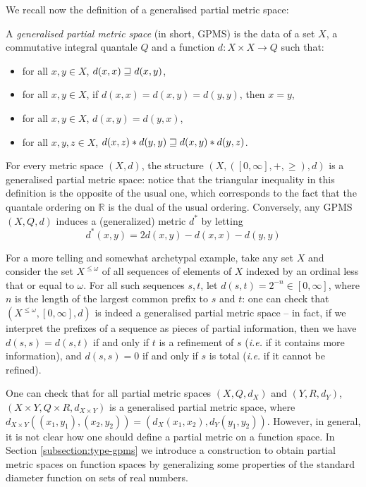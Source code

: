 We recall now the definition of a generalised partial metric space:


\begin{definition} A \emph{generalised partial metric space} (in short, GPMS) is the data of a set $X$, a commutative integral quantale $Q$ and a function $d : X \times X \to Q$ such that: \begin{itemize}
\item for all $x,y \in X$, $d(x,x) \sqsupseteq d(x,y)$,
\item for all $x,y \in X$, if $d(x,x) = d(x,y) = d(y,y)$, then $x = y$,
\item for all $x,y \in X$, $d(x,y) = d(y,x)$,
\item for all $x,y,z \in X$, $d(x,z) \mathbin{\ast} d(y,y) \sqsupseteq d(x,y) \mathbin{\ast} d(y,z)$.
\end{itemize}
\end{definition}

For every metric space $(X,d)$, the structure $(X, ([0,\infty], +, \geq), d)$ is a generalised partial metric space: notice that the triangular inequality in this definition is the opposite of the usual one, which corresponds to the fact that the quantale ordering on $\mathbb{R}$ is the dual of the usual ordering. 
Conversely, any GPMS $(X,Q,d)$ induces a (generalized) metric $d^{*}$ by letting 
\begin{equation}\label{eq:pmettomet}
d^{*}(x,y)=2d(x,y)-d(x,x)-d(y,y)\tag{$\star$}
\end{equation}


For a more telling and somewhat archetypal example, take any set $X$ and consider the set $X^{\leq \omega}$ of all sequences of elements of $X$ indexed by an ordinal less that or equal to $\omega$. For all such sequences $s,t$, let $d(s,t) = 2^{-n} \in [0,\infty]$, where $n$ is the length of the largest common prefix to $s$ and $t$: one can check that $(X^{\leq \omega}, [0,\infty], d)$ is indeed a generalised partial metric space -- in fact, if we interpret the prefixes of a sequence as pieces of partial information, then we have $d(s,s) = d(s,t)$ if and only if $t$ is a refinement of $s$ (\textit{i.e.} if it contains more information), and $d(s,s) = 0$ if and only if $s$ is total (\textit{i.e.} if it cannot be refined).

One can check that for all partial metric spaces $(X, Q, d_X)$ and $(Y, R, d_Y)$, $(X \times Y, Q \times R, d_{X \times Y})$ is a generalised partial metric space, where $d_{X \times Y}((x_1, y_1), (x_2, y_2)) = (d_X(x_1, x_2), d_Y(y_1, y_2))$. However, in general, it is not clear how one should define a partial metric on a function space. In  Section \ref{subsection:type-gpms} we introduce a construction to obtain partial metric spaces on function spaces by generalizing some properties of the standard diameter function on sets of real numbers.

